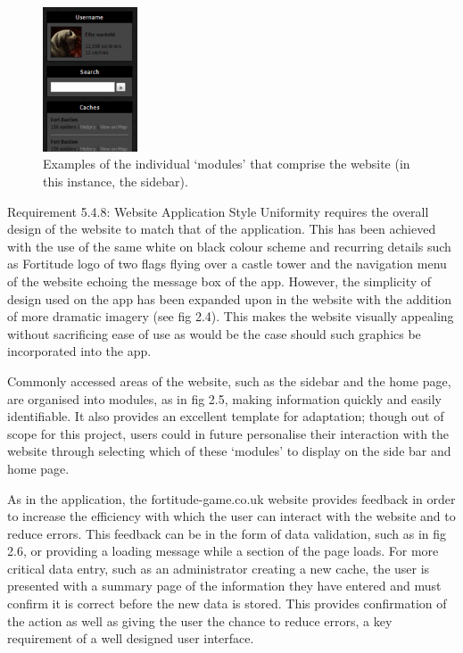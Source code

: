 \begin{figure}
	\vspace{-15pt}
	\begin{center}
	\includegraphics[width=0.25\textwidth]{images/sidebar_modules}
	\caption{Examples of the individual ‘modules’ that comprise the website (in this instance, the sidebar).}
	\label{sidebar_modules}
	\end{center}
	\vspace{-20pt}
\end{figure}

Requirement 5.4.8: Website Application Style Uniformity requires the overall design of the website to match that of the application. This has been achieved with the use of the same white on black colour scheme and recurring details such as Fortitude logo of two flags flying over a castle tower and the navigation menu of the website echoing the message box of the app. However, the simplicity of design used on the app has been expanded upon in the website with the addition of more dramatic imagery (see fig 2.4). This makes the website visually appealing without sacrificing ease of use as would be the case should such graphics be incorporated into the app.

Commonly accessed areas of the website, such as the sidebar and the home page, are organised into modules, as in fig 2.5, making information quickly and easily identifiable. It also provides an excellent template for adaptation; though out of scope for this project, users could in future personalise their interaction with the website through selecting which of these ‘modules’ to display on the side bar and home page. 


As in the application, the fortitude-game.co.uk website provides feedback in order to increase the efficiency with which the user can interact with the website and to reduce errors. This feedback can be in the form of data validation, such as in fig 2.6, or providing  a loading message while a section of the page loads. For more critical data entry, such as an administrator creating a new cache, the user is presented with a summary page of the information they have entered and must confirm it is correct before the new data is stored. This provides confirmation of the action as well as giving the user the chance to reduce errors, a key requirement of a well designed user interface.

